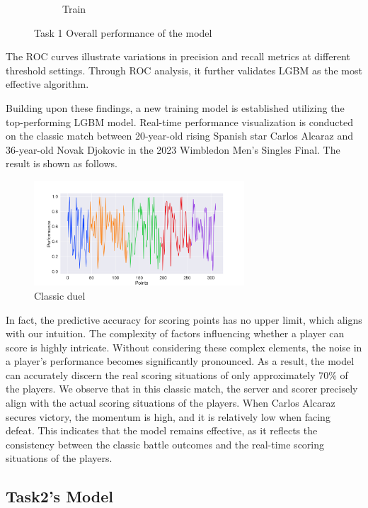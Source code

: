 \documentclass{article}
\begin{document}
\begin{figure}[H]
\begin{subfigure}{0.48\textwidth}
          \caption{Train}
          \label{fig:roc_train}
      \end{subfigure}
      \caption{Task 1 Overall performance of the model}
      \label{fig:overall}
\end{figure}

The ROC curves illustrate variations in precision and recall metrics at different threshold settings. Through ROC analysis, it further validates LGBM as the most effective algorithm.

Building upon these findings, a new training model is established utilizing the top-performing LGBM model. Real-time performance visualization is conducted on the classic match between 20-year-old rising Spanish star Carlos Alcaraz and 36-year-old Novak Djokovic in the 2023 Wimbledon Men's Singles Final. The result is shown as follows.
\begin{figure}[H]
      \centering
      \includegraphics[width=0.7\textwidth]{classic_duel_trend.png}
      \caption{Classic duel}
\end{figure}

In fact, the predictive accuracy for scoring points has no upper limit, which aligns with our intuition. The complexity of factors influencing whether a player can score is highly intricate. 
Without considering these complex elements, the noise in a player's performance becomes significantly pronounced. As a result, the model can accurately discern the real scoring situations of only approximately 70\% 
of the players. We observe that in this classic match, the server and scorer precisely align with the actual scoring situations of the players. When Carlos Alcaraz secures victory, the momentum is high, and it is relatively low when facing defeat. 
This indicates that the model remains effective, as it reflects the consistency between the classic battle outcomes and the real-time scoring situations of the players.
\subsection{Task2's Model}
\end{document}
